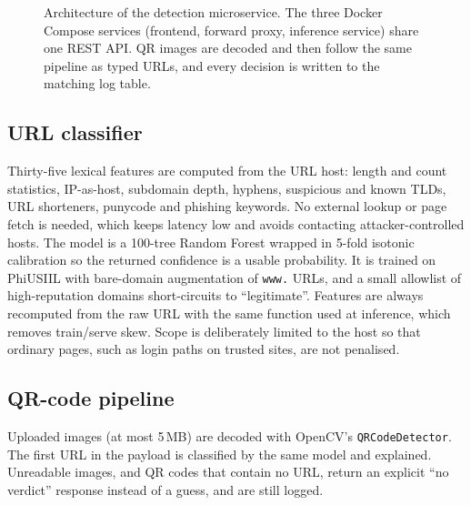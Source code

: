 \documentclass[conference]{IEEEtran}
\begin{document}
\begin{figure}[t]
{}
\caption{Architecture of the detection microservice. The three Docker Compose services (frontend, forward proxy, inference service) share one REST API. QR images are decoded and then follow the same pipeline as typed URLs, and every decision is written to the matching log table.}
\label{fig:arch}
\end{figure}

\subsection{URL classifier}
Thirty-five lexical features are computed from the URL host: length and count statistics, IP-as-host, subdomain depth, hyphens, suspicious and known TLDs, URL shorteners, punycode and phishing keywords. No external lookup or page fetch is needed, which keeps latency low and avoids contacting attacker-controlled hosts. The model is a 100-tree Random Forest \cite{breiman} wrapped in 5-fold isotonic calibration \cite{nm2005} so the returned confidence is a usable probability. It is trained on PhiUSIIL \cite{phiusiil} with bare-domain augmentation of \texttt{www.} URLs, and a small allowlist of high-reputation domains short-circuits to ``legitimate''. Features are always recomputed from the raw URL with the same function used at inference, which removes train/serve skew. Scope is deliberately limited to the host so that ordinary pages, such as login paths on trusted sites, are not penalised.

\subsection{QR-code pipeline}
Uploaded images (at most 5\,MB) are decoded with OpenCV's \texttt{QRCodeDetector}. The first URL in the payload is classified by the same model and explained. Unreadable images, and QR codes that contain no URL, return an explicit ``no verdict'' response instead of a guess, and are still logged.
\end{document}

